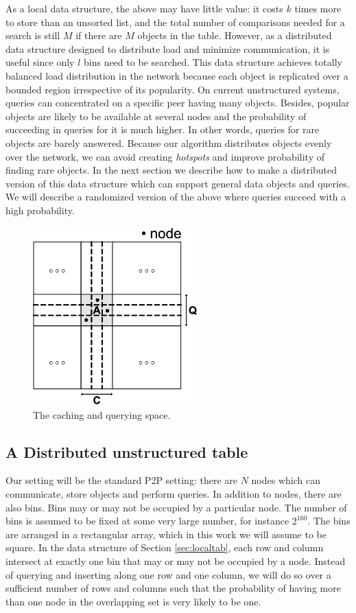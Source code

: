 \documentclass[9.5pt,journal,final,finalsubmission,twocolumn]{IEEEtran}
\begin{document}
As a local data structure, the above may have little value: it costs $k$ times
more to store than an unsorted list, and the total number of comparisons
needed for a search is still $M$ if there are $M$ objects in the table.
However, as a distributed data structure designed to distribute load and
minimize communication, it is useful since only $l$ bins need to be searched.
This data structure achieves totally balanced load distribution 
in the network because each object is replicated over a bounded region 
irrespective of its popularity. On current unstructured systems, queries 
can concentrated on a specific peer having many objects. Besides, popular objects 
are likely to be available at several nodes and the probability of succeeding in
queries for it is much higher. In other words, queries for rare
objects are barely 
answered. Because our algorithm distributes objects 
evenly over the network, we can avoid creating \emph{hotspots} and improve 
probability of finding rare objects.
In the next section we describe how to
make a distributed version of this data structure which can support general
data objects and queries.  We will describe a randomized version of the above
where queries succeed with a high probability.
\begin{figure}
\centering
\includegraphics[width=2.5in]{space}
\caption{The caching and querying space.} \label{fig:space}
\end{figure}

\subsection{A Distributed unstructured table}
\label{sec:table}
Our setting will be the standard P2P setting: there are $N$ nodes which can
communicate, store objects and perform queries.  In addition to nodes, there
are also bins.  Bins may or may not be occupied by a particular node.  The
number of bins is assumed to be fixed at some very large number, for instance
$2^{160}$.  The bins are arranged in a rectangular array, which in this work
we will assume to be square.  In the data structure of
Section \ref{sec:localtab}, each row and column intersect at exactly one
bin that may or may not be occupied by a node.  Instead of
querying and inserting along one row and one column, we will do so over a
sufficient number of rows and columns such that the probability of having 
more than one node in the overlapping set is very likely to be one.
\end{document}
